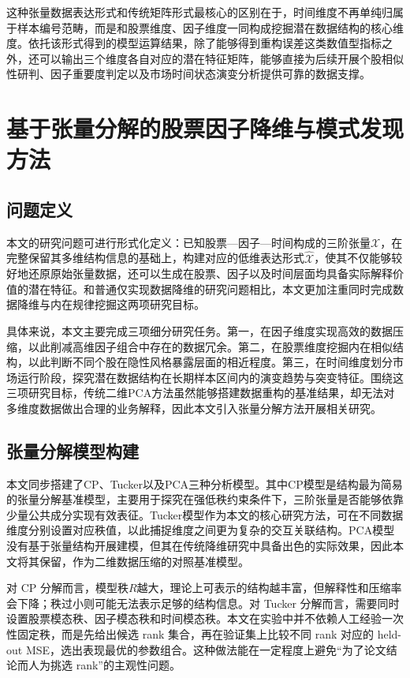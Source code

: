 这种张量数据表达形式和传统矩阵形式最核心的区别在于，时间维度不再单纯归属于样本编号范畴，而是和股票维度、因子维度一同构成挖掘潜在数据结构的核心维度。依托该形式得到的模型运算结果，除了能够得到重构误差这类数值型指标之外，还可以输出三个维度各自对应的潜在特征矩阵，能够直接为后续开展个股相似性研判、因子重要度判定以及市场时间状态演变分析提供可靠的数据支撑。

\chapter{基于张量分解的股票因子降维与模式发现方法}

\section{问题定义}

本文的研究问题可进行形式化定义：已知股票—因子—时间构成的三阶张量$\mathcal{X}$，在完整保留其多维结构信息的基础上，构建对应的低维表达形式$\hat{\mathcal{X}}$，使其不仅能够较好地还原原始张量数据，还可以生成在股票、因子以及时间层面均具备实际解释价值的潜在特征。和普通仅实现数据降维的研究问题相比，本文更加注重同时完成数据降维与内在规律挖掘这两项研究目标。

具体来说，本文主要完成三项细分研究任务。第一，在因子维度实现高效的数据压缩，以此削减高维因子组合中存在的数据冗余。第二，在股票维度挖掘内在相似结构，以此判断不同个股在隐性风格暴露层面的相近程度。第三，在时间维度划分市场运行阶段，探究潜在数据结构在长期样本区间内的演变趋势与突变特征。围绕这三项研究目标，传统二维PCA方法虽然能够搭建数据重构的基准结果，却无法对多维度数据做出合理的业务解释，因此本文引入张量分解方法开展相关研究。

\section{张量分解模型构建}

本文同步搭建了CP、Tucker以及PCA三种分析模型。其中CP模型是结构最为简易的张量分解基准模型，主要用于探究在强低秩约束条件下，三阶张量是否能够依靠少量公共成分实现有效表征。Tucker模型作为本文的核心研究方法，可在不同数据维度分别设置对应秩值，以此捕捉维度之间更为复杂的交互关联结构。PCA模型没有基于张量结构开展建模，但其在传统降维研究中具备出色的实际效果，因此本文将其保留，作为二维数据压缩的对照基准模型。

对 CP 分解而言，模型秩$R$越大，理论上可表示的结构越丰富，但解释性和压缩率会下降；秩过小则可能无法表示足够的结构信息。对 Tucker 分解而言，需要同时设置股票模态秩、因子模态秩和时间模态秩。本文在实验中并不依赖人工经验一次性固定秩，而是先给出候选 rank 集合，再在验证集上比较不同 rank 对应的 held-out MSE，选出表现最优的参数组合。这种做法能在一定程度上避免“为了论文结论而人为挑选 rank”的主观性问题。

